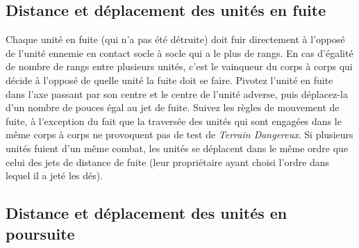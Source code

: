 \subsection*{Distance et déplacement des unités en fuite}
Chaque unité en fuite (qui n'a pas été détruite) doit fuir directement à l'opposé de l'unité ennemie en contact socle à socle qui a le plus de rangs. En cas d'égalité de nombre de rangs entre plusieurs unités, c'est le vainqueur du corps à corps qui décide à l'opposé de quelle unité la fuite doit se faire. Pivotez l'unité en fuite dans l'axe passant par son centre et le centre de l'unité adverse, puis déplacez-la d'un nombre de pouces égal au jet de fuite. Suivez les règles de mouvement de fuite, à l'exception du fait que la traversée des unités qui sont engagées dans le même corps à corps ne provoquent pas de test de \emph{Terrain Dangereux}. Si plusieurs unités fuient d'un même combat, les unités se déplacent dans le même ordre que celui des jets de distance de fuite (leur propriétaire ayant choisi l'ordre dans lequel il a jeté les dés).

\subsection*{Distance et déplacement des unités en poursuite}


